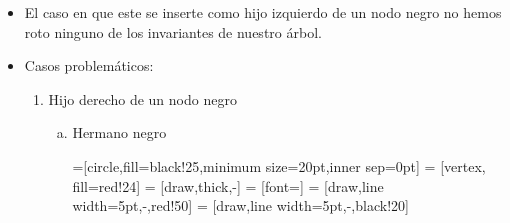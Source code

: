 \documentclass[dcc,sol]{fcfmcourse}
\begin{document}
\begin{itemize}
\item El caso en que este se inserte como hijo izquierdo de un nodo negro no hemos roto ninguno de los invariantes de nuestro árbol.
\item Casos problemáticos:
\begin{enumerate}
\item Hijo derecho de un nodo negro
\begin{enumerate}[a)]
\item Hermano negro


=[circle,fill=black!25,minimum size=20pt,inner sep=0pt]
 = [vertex, fill=red!24]
 = [draw,thick,-]
 = [font=\small]
 = [draw,line width=5pt,-,red!50]
 = [draw,line width=5pt,-,black!20]



\end{enumerate}
\end{enumerate}
\end{itemize}
\end{document}
